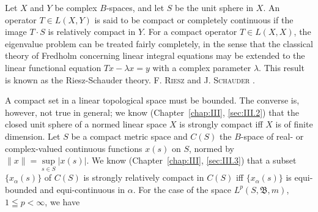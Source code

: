 \label{chap:X}

Let $X$ and $Y$ be complex $B$-spaces, and let $S$ be the unit sphere in $X$. An operator $T \in L(X, Y)$ is said to be compact or completely continuous if the image $T \cdot S$ is relatively compact in $Y$. For a compact operator $T \in L(X, X)$, the eigenvalue problem can be treated fairly completely, in the sense that the classical theory of Fredholm concerning linear integral equations may be extended to the linear functional equation $Tx - \lambda x = y$ with a complex parameter $\lambda$. This result is known as the Riesz-Schauder theory. F. \textsc{Riesz} \cite{rickart273} and J. \textsc{Schauder} \cite{schauder289}. 


\label{sec:X.1}

A compact set in a linear topological space must be bounded. The converse is, however, not true in general; we know (Chapter~\ref{chap:III}, \ref{sec:III.2}) that the closed unit sphere of a normed linear space $X$ is strongly compact iff $X$ is of finite dimension. Let $S$ be a compact metric space and $C(S)$ the $B$-space of real- or complex-valued continuous functions $x(s)$ on $S$, normed by $\|x\| = \sup\limits_{s \in S} |x(s)|$. We know (Chapter~\ref{chap:III}, \ref{sec:III.3}) that a subset $\{x_{\alpha}(s)\}$ of $C(S)$ is strongly relatively compact in $C(S)$ iff $\{x_{\alpha}(s)\}$ is equi-bounded and equi-continuous in $\alpha$. For the case of the space $L^p(S, \mathfrak{B}, m)$, $1 \leqq p < \infty$, we have 

